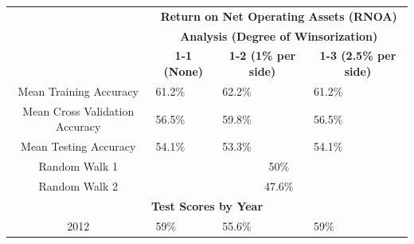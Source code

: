 {{\begin{table}[htb]
\centering
\begin{tabular}{clll}
\textbf{}                                            & \multicolumn{3}{c}{\textbf{Return on Net Operating Assets (RNOA)}}                                                                               \\ \cline{2-4} 
\multicolumn{1}{c|}{}                                & \multicolumn{3}{c|}{\textbf{Analysis (Degree of Winsorization)}}                                                                                 \\ \cline{2-4} 
\multicolumn{1}{c|}{}                                & \multicolumn{1}{c|}{\textbf{1-1 (None)}} & \multicolumn{1}{c|}{\textbf{1-2 (1\% per side)}} & \multicolumn{1}{c|}{\textbf{1-3 (2.5\% per side)}} \\ \hline
\multicolumn{1}{|c|}{Mean Training Accuracy}         & \multicolumn{1}{l|}{61.2\%}              & \multicolumn{1}{l|}{62.2\%}                      & \multicolumn{1}{l|}{61.2\%}                        \\ \hline
\multicolumn{1}{|c|}{Mean Cross Validation Accuracy} & \multicolumn{1}{l|}{56.5\%}              & \multicolumn{1}{l|}{59.8\%}                      & \multicolumn{1}{l|}{56.5\%}                        \\ \hline
\multicolumn{1}{|c|}{Mean Testing Accuracy}          & \multicolumn{1}{l|}{54.1\%}              & \multicolumn{1}{l|}{53.3\%}                      & \multicolumn{1}{l|}{54.1\%}                        \\ \hline
\multicolumn{1}{|c|}{Random Walk 1}                  & \multicolumn{3}{c|}{50\%}                                                                                                                        \\ \hline
\multicolumn{1}{|c|}{Random Walk 2}                  & \multicolumn{3}{c|}{47.6\%}                                                                                                                      \\ \hline
\multicolumn{4}{|c|}{\textbf{Test Scores by Year}}                                                                                                                                                      \\ \hline
\multicolumn{1}{|c|}{2012}                           & \multicolumn{1}{l|}{59\%}                & \multicolumn{1}{l|}{55.6\%}                      & \multicolumn{1}{l|}{59\%}                          \\ \hline

\end{tabular}
\end{table}}}
